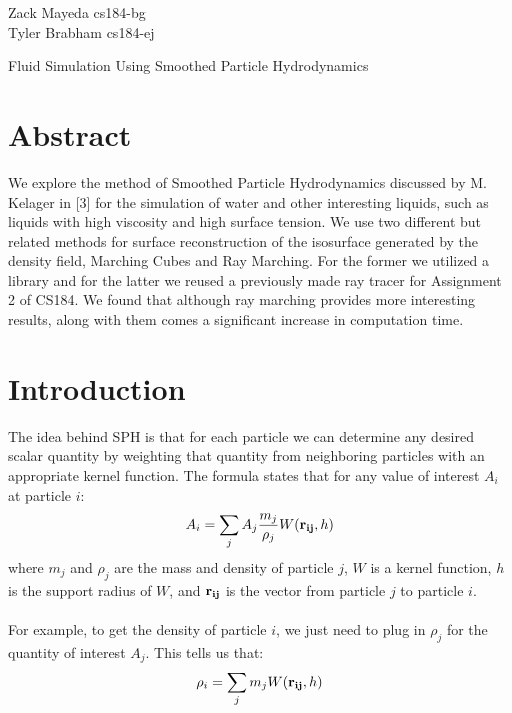 \documentclass[11pt]{article}
\begin{document}
\begin{flushright}
Zack Mayeda cs184-bg \\
Tyler Brabham cs184-ej
\end{flushright}

\begin{center}
\LARGE
Fluid Simulation Using Smoothed Particle Hydrodynamics
\end{center}

\section*{Abstract}
We explore the method of Smoothed Particle Hydrodynamics discussed by M. Kelager in [3] for the simulation of water and other interesting liquids, such as liquids with high viscosity and high surface tension. We use two different but related methods for surface reconstruction of the 
isosurface generated by the density field, Marching Cubes and Ray Marching. For the former we utilized a library and for the latter we reused a previously made ray tracer for Assignment 2 of CS184.  We found that although ray marching provides more interesting results, along with them comes a significant increase in computation time.

\section*{Introduction}
The idea behind SPH is that for each particle we can determine any desired scalar quantity by weighting that quantity from neighboring particles with an appropriate kernel function. The formula states that for any value of interest $A_i$ at particle $i$: $$A_i = \sum_{j} A_j \frac{m_j}{\rho_j}W({\bf r_{ij}},h)$$
where $m_j$ and $\rho_j$ are the mass and density of particle $j$, $W$ is a kernel function, $h$ is the support radius of $W$, and ${\bf r_{ij}}$ is the vector from particle $j$ to particle $i$. 
\\ \\
For example, to get the density of particle $i$, we just need to plug in $\rho_j$ for the quantity of interest $A_j$. This tells us that: 
\\
$$\rho_i = \sum_{j} m_jW({\bf r_{ij}},h)$$
\end{document}
